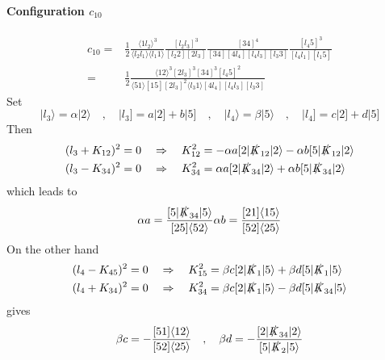 \paragraph{Configuration $c_{10}$}
\begin{equation*}
\begin{split}
c_{10} = &
\frac{1}{2}\frac{\langle 1l_2\rangle^3}{\langle l_2 l_1 \rangle\langle l_1 1 \rangle}
\frac{[l_2 l_3]^3}{[l_2 2 ][2 l_3]}
\frac{[34]^4}{[34][4 l_4][l_4 l_3][l_3 3]}
\frac{[l_4 5]^3}{[l_4 l_1][l_1 5]}
\\
= &
\frac{1}{2}\frac{\langle 12 \rangle^3[2l_3]^3[34]^3[l_4 5 ]^2}{\langle 51 \rangle[15][2l_3]^2\langle l_3 1\rangle [4 l_4][l_4 l_3][l_3 3]}
\end{split}
\end{equation*}
Set
\begin{equation*}
|l_3\rangle = \alpha |2\rangle \quad,\quad |l_3] = a|2] + b|5]
\quad,\quad
|l_4\rangle = \beta |5\rangle \quad,\quad |l_4] = c|2]+d|5]
\end{equation*}
Then
\begin{equation*}
\begin{split}
& (l_3 + K_{12})^2 = 0 \quad\Rightarrow\quad K_{12}^2 = - \alpha a [2|\slashed{K}_{12}|2\rangle - \alpha b [5|\slashed{K}_{12}|2\rangle
\\
& (l_3 - K_{34})^2 = 0 \quad\Rightarrow\quad K_{34}^2 = \alpha a [2|\slashed{K}_{34}|2\rangle + \alpha b [5|\slashed{K}_{34}|2\rangle
\end{split}
\end{equation*}
which leads to
\begin{equation*}
\alpha a = \frac{[5|\slashed{K}_{34}|5\rangle}{[25]\langle 52\rangle}
\\
\alpha b = \frac{[21]\langle 15\rangle}{[52]\langle 25\rangle}
\end{equation*}
On the other hand
\begin{equation*}
\begin{split}
& (l_4 - K_{45})^2 = 0 \quad\Rightarrow\quad
K_{15}^2 = \beta c[2|\slashed{K}_1|5\rangle + \beta d [5|\slashed{K}_1|5\rangle
\\
& (l_4 + K_{34})^2 = 0 \quad\Rightarrow\quad
K_{34}^2 = \beta c [2|\slashed{K}_1|5\rangle - \beta d [5|\slashed{K}_{34}|5\rangle
\end{split}
\end{equation*}
gives
\begin{equation*}
\beta c = - \frac{[51]\langle 12 \rangle}{[52]\langle 25 \rangle}
\quad,\quad
\beta d = - \frac{[2| \slashed{K}_{34}|2\rangle}{[5|\slashed{K}_2|5\rangle}
\end{equation*}
